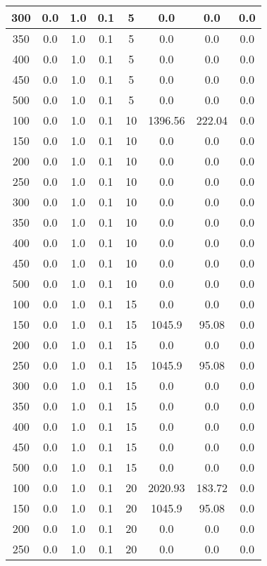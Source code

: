 \documentclass[a4paper, 12pt]{extreport}
\begin{document}
\begin{itemize}
\begin{longtable}{|c|c|c|c|c|c|c|c|}
			300 & 0.0 & 1.0 & 0.1 & 5 & 0.0 & 0.0 & 0.0 \\\hline
			350 & 0.0 & 1.0 & 0.1 & 5 & 0.0 & 0.0 & 0.0 \\\hline
			400 & 0.0 & 1.0 & 0.1 & 5 & 0.0 & 0.0 & 0.0 \\\hline
			450 & 0.0 & 1.0 & 0.1 & 5 & 0.0 & 0.0 & 0.0 \\\hline
			500 & 0.0 & 1.0 & 0.1 & 5 & 0.0 & 0.0 & 0.0 \\\hline
			100 & 0.0 & 1.0 & 0.1 & 10 & 1396.56 & 222.04 & 0.0 \\\hline
			150 & 0.0 & 1.0 & 0.1 & 10 & 0.0 & 0.0 & 0.0 \\\hline
			200 & 0.0 & 1.0 & 0.1 & 10 & 0.0 & 0.0 & 0.0 \\\hline
			250 & 0.0 & 1.0 & 0.1 & 10 & 0.0 & 0.0 & 0.0 \\\hline
			300 & 0.0 & 1.0 & 0.1 & 10 & 0.0 & 0.0 & 0.0 \\\hline
			350 & 0.0 & 1.0 & 0.1 & 10 & 0.0 & 0.0 & 0.0 \\\hline
			400 & 0.0 & 1.0 & 0.1 & 10 & 0.0 & 0.0 & 0.0 \\\hline
			450 & 0.0 & 1.0 & 0.1 & 10 & 0.0 & 0.0 & 0.0 \\\hline
			500 & 0.0 & 1.0 & 0.1 & 10 & 0.0 & 0.0 & 0.0 \\\hline
			100 & 0.0 & 1.0 & 0.1 & 15 & 0.0 & 0.0 & 0.0 \\\hline
			150 & 0.0 & 1.0 & 0.1 & 15 & 1045.9 & 95.08 & 0.0 \\\hline
			200 & 0.0 & 1.0 & 0.1 & 15 & 0.0 & 0.0 & 0.0 \\\hline
			250 & 0.0 & 1.0 & 0.1 & 15 & 1045.9 & 95.08 & 0.0 \\\hline
			300 & 0.0 & 1.0 & 0.1 & 15 & 0.0 & 0.0 & 0.0 \\\hline
			350 & 0.0 & 1.0 & 0.1 & 15 & 0.0 & 0.0 & 0.0 \\\hline
			400 & 0.0 & 1.0 & 0.1 & 15 & 0.0 & 0.0 & 0.0 \\\hline
			450 & 0.0 & 1.0 & 0.1 & 15 & 0.0 & 0.0 & 0.0 \\\hline
			500 & 0.0 & 1.0 & 0.1 & 15 & 0.0 & 0.0 & 0.0 \\\hline
			100 & 0.0 & 1.0 & 0.1 & 20 & 2020.93 & 183.72 & 0.0 \\\hline
			150 & 0.0 & 1.0 & 0.1 & 20 & 1045.9 & 95.08 & 0.0 \\\hline
			200 & 0.0 & 1.0 & 0.1 & 20 & 0.0 & 0.0 & 0.0 \\\hline
			250 & 0.0 & 1.0 & 0.1 & 20 & 0.0 & 0.0 & 0.0 \\\hline

\end{longtable}
\end{itemize}
\end{document}
